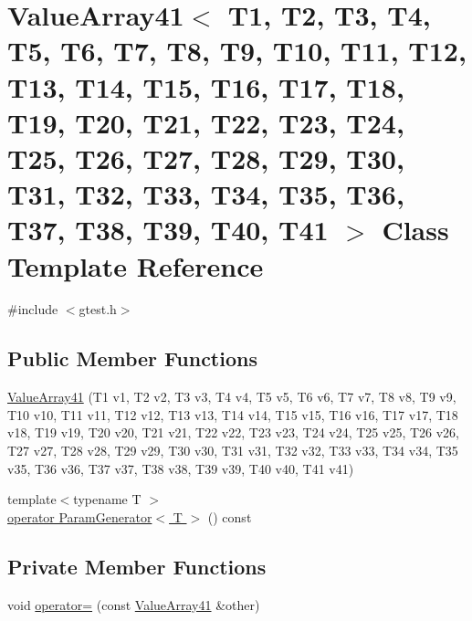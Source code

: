 \hypertarget{classtesting_1_1internal_1_1ValueArray41}{\section{\-Value\-Array41$<$ \-T1, \-T2, \-T3, \-T4, \-T5, \-T6, \-T7, \-T8, \-T9, \-T10, \-T11, \-T12, \-T13, \-T14, \-T15, \-T16, \-T17, \-T18, \-T19, \-T20, \-T21, \-T22, \-T23, \-T24, \-T25, \-T26, \-T27, \-T28, \-T29, \-T30, \-T31, \-T32, \-T33, \-T34, \-T35, \-T36, \-T37, \-T38, \-T39, \-T40, \-T41 $>$ \-Class \-Template \-Reference}
\label{d3/de4/classtesting_1_1internal_1_1ValueArray41}
}


{\ttfamily \#include $<$gtest.\-h$>$}

\subsection*{\-Public \-Member \-Functions}
\begin{DoxyCompactItemize}
\item 
\hyperlink{classtesting_1_1internal_1_1ValueArray41_a6787419ce4efbd1db9c6d42991399027}{\-Value\-Array41} (\-T1 v1, \-T2 v2, \-T3 v3, \-T4 v4, \-T5 v5, \-T6 v6, \-T7 v7, \-T8 v8, \-T9 v9, \-T10 v10, \-T11 v11, \-T12 v12, \-T13 v13, \-T14 v14, \-T15 v15, \-T16 v16, \-T17 v17, \-T18 v18, \-T19 v19, \-T20 v20, \-T21 v21, \-T22 v22, \-T23 v23, \-T24 v24, \-T25 v25, \-T26 v26, \-T27 v27, \-T28 v28, \-T29 v29, \-T30 v30, \-T31 v31, \-T32 v32, \-T33 v33, \-T34 v34, \-T35 v35, \-T36 v36, \-T37 v37, \-T38 v38, \-T39 v39, \-T40 v40, \-T41 v41)
\item 
{\footnotesize template$<$typename T $>$ }\\\hyperlink{classtesting_1_1internal_1_1ValueArray41_a08ef46fa12c9dd8ef6fc630baeea89b7}{operator Param\-Generator$<$ T $>$} () const 
\end{DoxyCompactItemize}
\subsection*{\-Private \-Member \-Functions}
\begin{DoxyCompactItemize}
\item 
void \hyperlink{classtesting_1_1internal_1_1ValueArray41_ac477dfff2e51745f36ad0c131bd16f82}{operator=} (const \hyperlink{classtesting_1_1internal_1_1ValueArray41}{\-Value\-Array41} \&other)
\end{DoxyCompactItemize}
